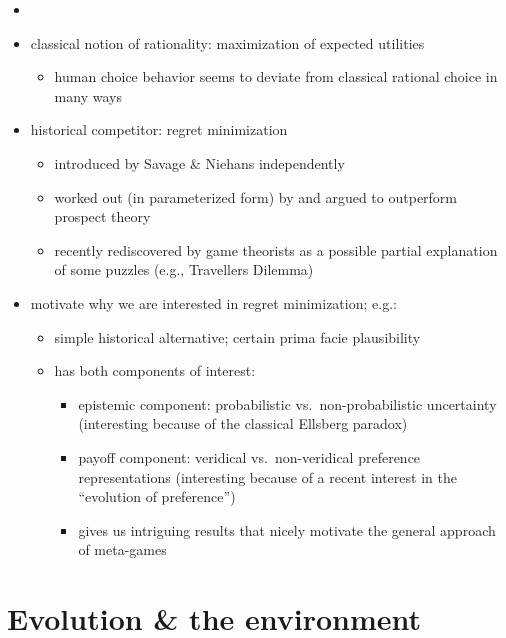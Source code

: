 \documentclass[fleqn,reqno,11pt]{article}
\begin{document}
\begin{itemize}
  \item {}
\item classical notion of rationality: maximization of expected utilities
  \begin{itemize}
  \item human choice behavior seems to deviate from classical rational choice in many ways
    \citep[most
    notably][]{TverskyKahnemann1974:Judgement-under,KahnemannTversky1979:Prospect-Theory}
  \end{itemize}
\item historical competitor: regret minimization
  \begin{itemize}
  \item introduced by Savage \& Niehans independently
  \item worked out (in parameterized form) by \citet{LoomesSugden1982:Regret-Theory:-} and
    argued to outperform prospect theory
  \item recently rediscovered by game theorists \citep{HalpernPass2012:Iterated-Regret} as a
    possible partial explanation of some puzzles (e.g., Travellers Dilemma)
  \end{itemize}
\item motivate why we are interested in regret minimization; e.g.:
  \begin{itemize}
  \item simple historical alternative; certain prima facie plausibility
  \item has both components of interest:
    \begin{itemize}
    \item epistemic component: probabilistic vs.~non-probabilistic uncertainty  (interesting
      because of the classical Ellsberg paradox)
    \item payoff component: veridical vs.~non-veridical preference representations (interesting
      because of a recent interest in the ``evolution of preference'')
    \item gives us intriguing results that nicely motivate the general approach of meta-games
    \end{itemize}
  \end{itemize}
\end{itemize}

\section{Evolution \& the environment}
\end{document}
